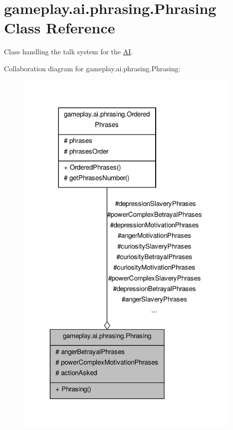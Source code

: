 \hypertarget{classgameplay_1_1ai_1_1phrasing_1_1_phrasing}{\section{gameplay.\-ai.\-phrasing.\-Phrasing Class Reference}
\label{classgameplay_1_1ai_1_1phrasing_1_1_phrasing}
}


Class handling the talk system for the \hyperlink{classgameplay_1_1ai_1_1_a_i}{A\-I}.  




Collaboration diagram for gameplay.\-ai.\-phrasing.\-Phrasing\-:
\nopagebreak
\begin{figure}[H]
\begin{center}
\leavevmode
\includegraphics[width=308pt]{classgameplay_1_1ai_1_1phrasing_1_1_phrasing__coll__graph}
\end{center}
\end{figure}
